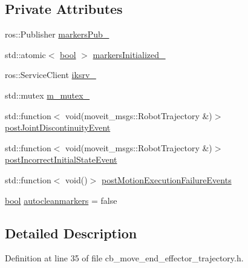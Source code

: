 \subsection*{Private Attributes}
\begin{DoxyCompactItemize}
\item 
ros\+::\+Publisher \hyperlink{classcl__move__group__interface_1_1CbMoveEndEffectorTrajectory_aabc2216b2d8625fecd83c5ec69928e63}{markers\+Pub\+\_\+}
\item 
std\+::atomic$<$ \hyperlink{classbool}{bool} $>$ \hyperlink{classcl__move__group__interface_1_1CbMoveEndEffectorTrajectory_ac140a7f0adfb20f1e2900a5c8cd2ca5b}{markers\+Initialized\+\_\+}
\item 
ros\+::\+Service\+Client \hyperlink{classcl__move__group__interface_1_1CbMoveEndEffectorTrajectory_a8a2e2225a5b53325241e45e4e28fa3a7}{iksrv\+\_\+}
\item 
std\+::mutex \hyperlink{classcl__move__group__interface_1_1CbMoveEndEffectorTrajectory_a2a98ef725cb3fc7f61654d3d6a2066bb}{m\+\_\+mutex\+\_\+}
\item 
std\+::function$<$ void(moveit\+\_\+msgs\+::\+Robot\+Trajectory \&)$>$ \hyperlink{classcl__move__group__interface_1_1CbMoveEndEffectorTrajectory_a308331beab9b2ec0eae72fa56fa999c9}{post\+Joint\+Discontinuity\+Event}
\item 
std\+::function$<$ void(moveit\+\_\+msgs\+::\+Robot\+Trajectory \&)$>$ \hyperlink{classcl__move__group__interface_1_1CbMoveEndEffectorTrajectory_a6180230347c922fa0d85f514ce5029df}{post\+Incorrect\+Initial\+State\+Event}
\item 
std\+::function$<$ void()$>$ \hyperlink{classcl__move__group__interface_1_1CbMoveEndEffectorTrajectory_a72c4a469b70617dc5ea75e225a013582}{post\+Motion\+Execution\+Failure\+Events}
\item 
\hyperlink{classbool}{bool} \hyperlink{classcl__move__group__interface_1_1CbMoveEndEffectorTrajectory_a790c30b94509dc6f4d0064f6356a04db}{autocleanmarkers} = false
\end{DoxyCompactItemize}


\subsection{Detailed Description}


Definition at line 35 of file cb\+\_\+move\+\_\+end\+\_\+effector\+\_\+trajectory.\+h.



